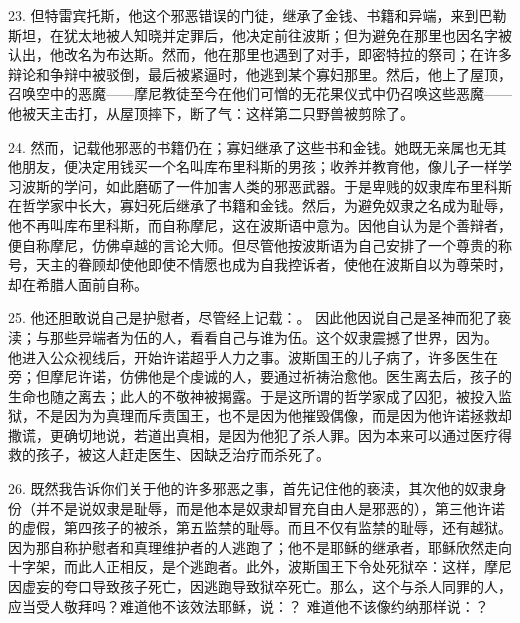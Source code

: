 23. 但特雷宾托斯，他这个邪恶错误的门徒，继承了金钱、书籍和异端，来到巴勒斯坦，在犹太地被人知晓并定罪后，他决定前往波斯；但为避免在那里也因名字被认出，他改名为布达斯。然而，他在那里也遇到了对手，即密特拉的祭司；在许多辩论和争辩中被驳倒，最后被紧逼时，他逃到某个寡妇那里。然后，他上了屋顶，召唤空中的恶魔——摩尼教徒至今在他们可憎的无花果仪式中仍召唤这些恶魔——他被天主击打，从屋顶摔下，断了气：这样第二只野兽被剪除了。\par

24. 然而，记载他邪恶的书籍仍在；寡妇继承了这些书和金钱。她既无亲属也无其他朋友，便决定用钱买一个名叫库布里科斯的男孩；收养并教育他，像儿子一样学习波斯的学问，如此磨砺了一件加害人类的邪恶武器。于是卑贱的奴隶库布里科斯在哲学家中长大，寡妇死后继承了书籍和金钱。然后，为避免奴隶之名成为耻辱，他不再叫库布里科斯，而自称摩尼，这在波斯语中意为。因他自认为是个善辩者，便自称摩尼，仿佛卓越的言论大师。但尽管他按波斯语为自己安排了一个尊贵的称号，天主的眷顾却使他即使不情愿也成为自我控诉者，使他在波斯自以为尊荣时，却在希腊人面前自称。\par

25. 他还胆敢说自己是护慰者，尽管经上记载：。 因此他因说自己是圣神而犯了亵渎；与那些异端者为伍的人，看看自己与谁为伍。这个奴隶震撼了世界，因为。 他进入公众视线后，开始许诺超乎人力之事。波斯国王的儿子病了，许多医生在旁；但摩尼许诺，仿佛他是个虔诚的人，要通过祈祷治愈他。医生离去后，孩子的生命也随之离去；此人的不敬神被揭露。于是这所谓的哲学家成了囚犯，被投入监狱，不是因为为真理而斥责国王，也不是因为他摧毁偶像，而是因为他许诺拯救却撒谎，更确切地说，若道出真相，是因为他犯了杀人罪。因为本来可以通过医疗得救的孩子，被这人赶走医生、因缺乏治疗而杀死了。\par

26. 既然我告诉你们关于他的许多邪恶之事，首先记住他的亵渎，其次他的奴隶身份（并不是说奴隶是耻辱，而是他本是奴隶却冒充自由人是邪恶的），第三他许诺的虚假，第四孩子的被杀，第五监禁的耻辱。而且不仅有监禁的耻辱，还有越狱。因为那自称护慰者和真理维护者的人逃跑了；他不是耶稣的继承者，耶稣欣然走向十字架，而此人正相反，是个逃跑者。此外，波斯国王下令处死狱卒：这样，摩尼因虚妄的夸口导致孩子死亡，因逃跑导致狱卒死亡。那么，这个与杀人同罪的人，应当受人敬拜吗？难道他不该效法耶稣，说：？ 难道他不该像约纳那样说：？\par

